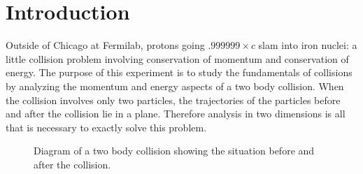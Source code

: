 \newexp
\section*{Introduction}
Outside of Chicago at Fermilab, protons going $.999999\times c$ slam
into iron nuclei: a little collision problem involving conservation of momentum
and conservation of energy.
The purpose of this experiment is to study the fundamentals of
collisions by analyzing the momentum and energy aspects of a two body
collision.  When the collision involves only two particles, the
trajectories of the particles before and after the collision lie in a
plane.  Therefore analysis in two dimensions is all that is necessary
to exactly solve this problem.%
\begin{figure}
\begin{center}
{}
\end{center}
\caption{Diagram of a two body collision showing the situation before and
   after the collision.  \label{fig:tb1}}
\end{figure}

